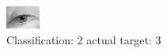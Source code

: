 \begin{figure}[h!]
\begin{center}
\includegraphics[width=0.60\columnwidth]{figures/ID2873_class_2_target_3.png}
\end{center}
\caption{ Classification: 2 actual target: 3}
\label{fig:ID2873_class_2_target_3}
\end{figure}
